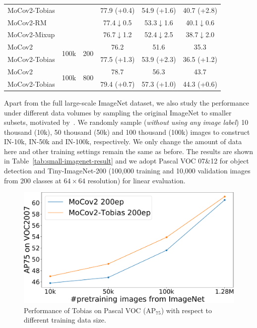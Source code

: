 \documentclass[letterpaper]{article}
\def\pt{\phantom{0}}
\begin{document}
\begin{table}
\begin{tabular}{l|r|r|c|c|c}
		MoCov2-Tobias& &    &     77.9 (\textcolor{grassgreen}{+0.4})   &        54.9 (\textcolor{grassgreen}{+1.6})     & 40.7 (\textcolor{grassgreen}{+2.8}) \\
		MoCov2-RM&&     &          77.4\pt$\downarrow$0.5\pt     &  53.3\pt$\downarrow$1.6\pt           & 40.1\pt$\downarrow$0.6\pt  \\
		MoCov2-Mixup&&&76.7\pt$\downarrow$1.2\pt &52.4\pt$\downarrow$2.5\pt &38.7\pt$\downarrow$2.0\pt \\
		\cline{1-6}
		MoCov2&\multirow{2}{*}{100k} &   \multirow{2}{*}{200}  &          76.2 \pt\pt\pt\pt\pt &    51.6  \pt\pt\pt\pt\pt                &  35.3 \pt\pt\pt\pt\pt  \\
		MoCov2-Tobias& &    &     77.5 (\textcolor{grassgreen}{+1.3})    &        53.9 (\textcolor{grassgreen}{+2.3})    &  36.5 (\textcolor{grassgreen}{+1.2}) \\
		\cline{1-6}
		MoCov2&\multirow{2}{*}{100k} &   \multirow{2}{*}{800}  &          78.7 \pt\pt\pt\pt\pt    &    56.3  \pt\pt\pt\pt\pt                &  43.7 \pt\pt\pt\pt\pt  \\
		MoCov2-Tobias& &    &     79.4 (\textcolor{grassgreen}{+0.7})    &        57.3 (\textcolor{grassgreen}{+1.0})    &  44.3 (\textcolor{grassgreen}{+0.6}) \\
		\hline
	\end{tabular}
\end{table}

Apart from the full large-scale ImageNet dataset, we also study the performance under different data volumes by sampling the original ImageNet to smaller subsets, motivated by~\citet{S3L:cao:arxiv2021}. We randomly sample (\textit{without using any image label}) 10 thousand (10k), 50 thousand (50k) and 100 thousand (100k) images to construct IN-10k, IN-50k and IN-100k, respectively. We only change the amount of data here and other training settings remain the same as before. The results are shown in Table~\ref{tab:small-imagenet-result} and we adopt Pascal VOC 07\&12 for object detection and Tiny-ImageNet-200 (100,000 training and 10,000 validation images from 200 classes at $64 \times 64$ resolution) for linear evaluation.

\begin{figure}
	\centering
	\includegraphics[width=0.9\linewidth]{res}
	\caption{Performance of Tobias on Pascal VOC ($\text{AP}_{75}$) with respect to different training data size.}
	\label{fig:ap-size}
\end{figure}
\end{document}
